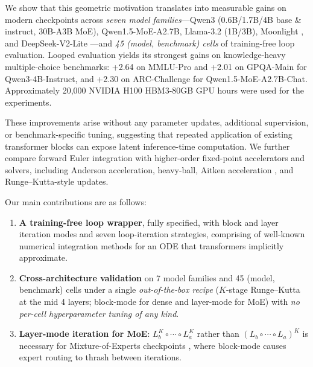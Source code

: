 We show that this geometric motivation translates into measurable gains on modern checkpoints across \emph{seven model families}---Qwen3 \citep{qwen3} (0.6B/1.7B/4B base \& instruct, 30B-A3B MoE), Qwen1.5-MoE-A2.7B, Llama-3.2 \citep{llama3} (1B/3B), Moonlight \citep{moonlight}, and DeepSeek-V2-Lite \citep{deepseekv2}---and \emph{45 (model, benchmark) cells} of training-free loop evaluation. Looped evaluation yields its strongest gains on knowledge-heavy multiple-choice benchmarks: +2.64 on MMLU-Pro \citep{wang2024mmlupro} and +2.01 on GPQA-Main \citep{rein2024gpqa} for Qwen3-4B-Instruct, and +2.30 on ARC-Challenge \citep{clark2018arc} for Qwen1.5-MoE-A2.7B-Chat. Approximately 20,000 NVIDIA H100 HBM3-80GB GPU hours were used for the experiments.

These improvements arise without any parameter updates, additional supervision, or benchmark-specific tuning, suggesting that repeated application of existing transformer blocks can expose latent inference-time computation. We further compare forward Euler integration with higher-order fixed-point accelerators and solvers, including Anderson acceleration, heavy-ball, Aitken acceleration \citep{walker2011anderson}, and Runge--Kutta-style updates.

Our main contributions are as follows:
\begin{enumerate}
\item \textbf{A training-free loop wrapper}, fully specified, with block and layer iteration modes and seven loop-iteration strategies, comprising of well-known numerical integration methods for an ODE that transformers implicitly approximate.
\item \textbf{Cross-architecture validation} on 7 model families and 45 (model, benchmark) cells under a single \emph{out-of-the-box recipe} ($K$-stage Runge–Kutta at the mid 4 layers; block-mode for dense and layer-mode for MoE) with \emph{no per-cell hyperparameter tuning of any kind}.
\item \textbf{Layer-mode iteration for MoE}: $L_b^K \circ \cdots \circ L_a^K$ rather than $(L_b \circ \cdots \circ L_a)^K$ is necessary for Mixture-of-Experts checkpoints \citep{csordas2024moeut,bae2024relaxed,bae2025mor}, where block-mode causes expert routing to thrash between iterations.
\end{enumerate}
